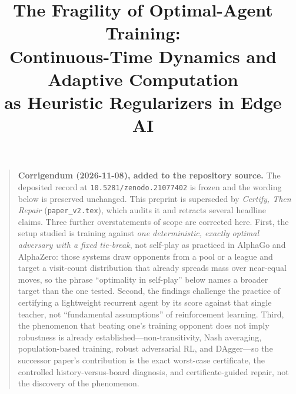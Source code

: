 \documentclass[conference]{IEEEtran}
\begin{document}
\title{The Fragility of Optimal-Agent Training:\\
Continuous-Time Dynamics and Adaptive Computation\\
as Heuristic Regularizers in Edge AI}

\author{
}

\maketitle

\begin{quote}
\small\textbf{Corrigendum (2026-11-08), added to the repository source.} The
deposited record at \texttt{10.5281/zenodo.21077402} is frozen and the wording
below is preserved unchanged. This preprint is superseded by \emph{Certify, Then
Repair} (\texttt{paper\_v2.tex}), which audits it and retracts several headline
claims. Three further overstatements of scope are corrected here. First, the
setup studied is training against \emph{one deterministic, exactly optimal
adversary with a fixed tie-break}, not self-play as practiced in AlphaGo and
AlphaZero: those systems draw opponents from a pool or a league and target a
visit-count distribution that already spreads mass over near-equal moves, so the
phrase ``optimality in self-play'' below names a broader target than the one
tested. Second, the findings challenge the practice of certifying a lightweight
recurrent agent by its score against that single teacher, not ``fundamental
assumptions'' of reinforcement learning. Third, the phenomenon that beating one's
training opponent does not imply robustness is already established---non-transitivity,
Nash averaging, population-based training, robust adversarial RL, and DAgger---so
the successor paper's contribution is the exact worst-case certificate, the
controlled history-versus-board diagnosis, and certificate-guided repair, not the
discovery of the phenomenon.
\end{quote}
\end{document}
